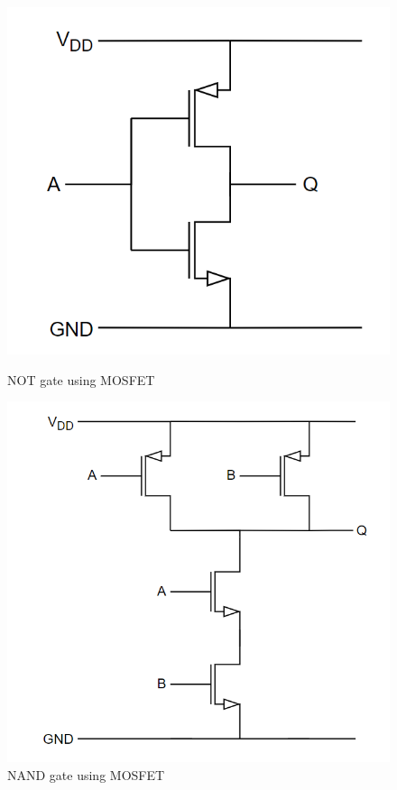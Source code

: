 \begin{figure}[H]
\begin{minipage}{0.5\textwidth}
    \centering
    \includegraphics[width=\linewidth]{Figures/Not gate.png}
    \caption{NOT gate using MOSFET}
    \label{fig:NOT}
\end{minipage}
\begin{minipage}{0.5\textwidth}
    \centering
    \includegraphics[width=\linewidth]{Figures/Nand Gate.png}
    \caption{NAND gate using MOSFET}
    \label{fig:NAND}
\end{minipage}
\end{figure}

